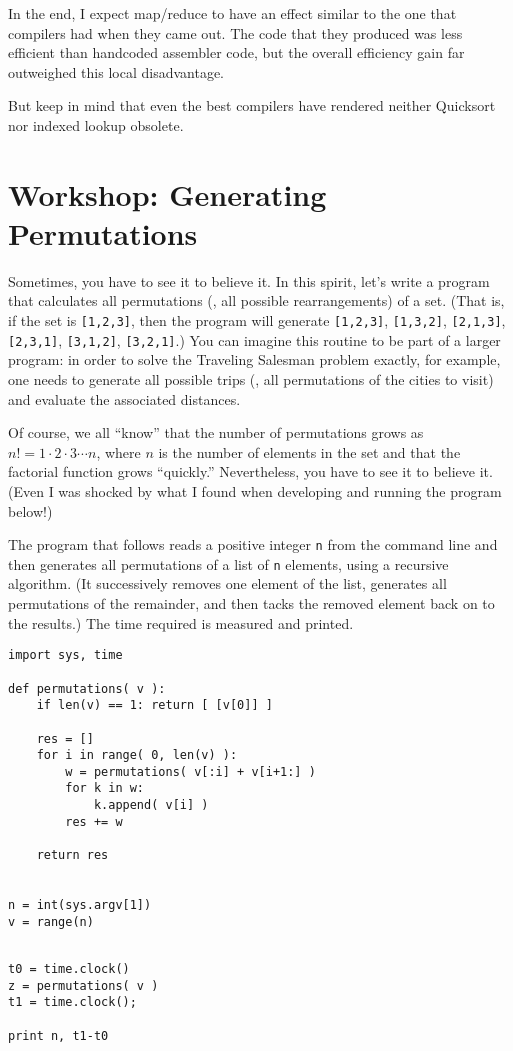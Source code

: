 In the end, I expect map/reduce to have an effect similar to the one
that compilers had when they came out. The code that they produced was
less efficient than handcoded assembler code, but the overall efficiency
gain far outweighed this local disadvantage.

But keep in mind that even the best compilers have rendered neither
Quicksort nor indexed lookup obsolete.

\section{Workshop: Generating Permutations}


Sometimes, you have to see it to believe it. In this spirit, let's
write a program that calculates all permutations (\ie, all possible
rearrangements) of a set. (That is, if the set is \texttt{[1,2,3]},
then the program will generate \texttt{[1,2,3]}, \texttt{[1,3,2]},
\texttt{[2,1,3]}, \texttt{[2,3,1]}, \texttt{[3,1,2]},
\texttt{[3,2,1]}.)  You can imagine this routine to be part of a
larger program: in order to solve the Traveling Salesman problem
exactly, for example, one needs to generate all possible trips (\ie,
all permutations of the cities to visit) and evaluate the associated
distances.

Of course, we all ``know'' that the number of permutations grows as
$n! = 1 \cdot 2 \cdot 3 \dotsb n$, where $n$ is the number of elements
in the set and that the factorial function grows ``quickly.''
Nevertheless, you have to see it to believe it. (Even I was shocked by
what I found when developing and running the program below!)

The program that follows reads a positive integer \texttt{n} from the
command line and then generates all permutations of a list of
\texttt{n} elements, using a recursive algorithm. (It successively
removes one element of the list, generates all permutations of the
remainder, and then tacks the removed element back on to the results.)
The time required is measured and printed.

\begin{verbatim}
import sys, time

def permutations( v ):
    if len(v) == 1: return [ [v[0]] ]

    res = []
    for i in range( 0, len(v) ):
        w = permutations( v[:i] + v[i+1:] )
        for k in w:
            k.append( v[i] )
        res += w
        
    return res


n = int(sys.argv[1])
v = range(n)
\end{verbatim}
\begin{verbatim}

t0 = time.clock()
z = permutations( v )
t1 = time.clock();

print n, t1-t0
\end{verbatim}

